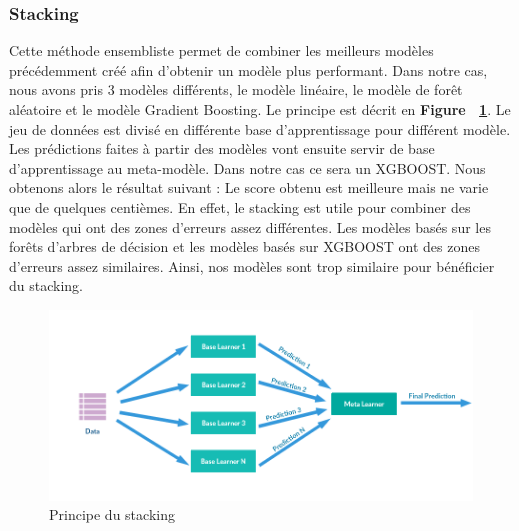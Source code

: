 \documentclass{article} %
\begin{document}
\subsubsection{Stacking}
Cette méthode ensembliste permet de combiner les meilleurs modèles précédemment créé afin d'obtenir un modèle plus performant. Dans notre cas, nous avons pris 3 modèles différents, le modèle linéaire, le modèle de forêt aléatoire et le modèle Gradient Boosting. Le principe est décrit en \textbf{Figure ~\ref{fig:stacking}}. Le jeu de données est divisé en différente base d'apprentissage pour différent modèle. Les prédictions faites à partir des modèles vont ensuite servir de base d'apprentissage au meta-modèle. Dans notre cas ce sera un XGBOOST. Nous obtenons alors le résultat suivant : 
Le score obtenu est meilleure mais ne varie que de quelques centièmes. En effet, le stacking est utile pour combiner des modèles qui ont des zones d'erreurs assez différentes. Les modèles basés sur les forêts d'arbres de décision et les modèles basés sur XGBOOST ont des zones d'erreurs assez similaires. Ainsi, nos modèles sont trop similaire pour bénéficier du stacking.

\begin{figure}[!h]
	\centering
	\includegraphics[keepaspectratio = true,scale=0.65]{stacking.png}
	\caption{Principe du stacking}
	\label{fig:stacking}
\end{figure}
\newpage
\end{document}
